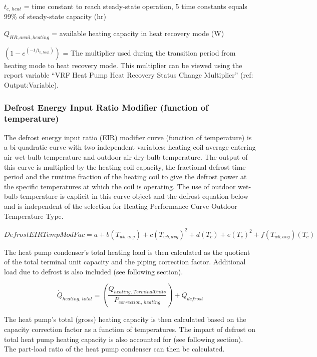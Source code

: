 \(t_{c,\, heat}\) = time constant to reach steady-state operation, 5 time constants equals 99\% of steady-state capacity (hr)

\(Q_{HR,avail,heating}\) = available heating capacity in heat recovery mode (W)

\(\left( 1 - e^{\left( -t / t_{c,heat} \right)} \right)\) = The multiplier used during the transition period from heating mode to heat recovery mode. This multiplier can be viewed using the report variable ``VRF Heat Pump Heat Recovery Status Change Multiplier'' (ref: Output:Variable).

\subsubsection{Defrost Energy Input Ratio Modifier (function of temperature)}\label{defrost-energy-input-ratio-modifier-function-of-temperature}

The defrost energy input ratio (EIR) modifier curve (function of temperature) is a bi-quadratic curve with two independent variables: heating coil average entering air wet-bulb temperature and outdoor air dry-bulb temperature. The output of this curve is multiplied by the heating coil capacity, the fractional defrost time period and the runtime fraction of the heating coil to give the defrost power at the specific temperatures at which the coil is operating. The use of outdoor wet-bulb temperature is explicit in this curve object and the defrost equation below and is independent of the selection for Heating Performance Curve Outdoor Temperature Type.

\begin{equation}
  DefrostEIRTempModFac = a + b\left( {{T_{wb,avg}}} \right) + c{\left( {{T_{wb,avg}}} \right)^2} + d\left( {{T_c}} \right) + e{\left( {{T_c}} \right)^2} + f\left( {{T_{wb,avg}}} \right)\left( {{T_c}} \right)
\end{equation}

The heat pump condenser's total heating load is then calculated as the quotient of the total terminal unit capacity and the piping correction factor. Additional load due to defrost is also included (see following section).

\begin{equation}
  \dot{Q}_{heating,\,total} = \left( \frac{\dot{Q}_{heating,\,TerminalUnits}}{P_{correction,\,heating}} \right) + \dot{Q}_{defrost}
\end{equation}

The heat pump's total (gross) heating capacity is then calculated based on the capacity correction factor as a function of temperatures. The impact of defrost on total heat pump heating capacity is also accounted for (see following section). The part-load ratio of the heat pump condenser can then be calculated.

